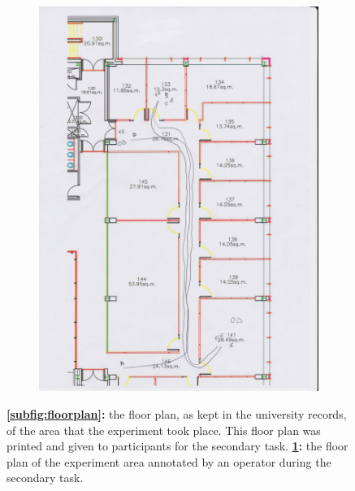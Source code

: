 \documentclass[a4paper,12pt,oneside,openright]{bhamthesis}
\begin{document}
\begin{figure}
\begin{subfigure}[b]{0.49\textwidth}
			\includegraphics[width=\textwidth]{chapter5_fig/floorplan_annotated.jpeg}
			\caption{}
			\label{subfig:floorplan_annotated}
		\end{subfigure}
		\hfill
		\caption{ \textbf{\ref{subfig:floorplan}:} the floor plan, as kept in the university records, of the area that the experiment took place. This floor plan was printed and given to participants for the secondary task. \textbf{\ref{subfig:floorplan_annotated}:} the floor plan of the experiment area annotated by an operator during the secondary task.}
		\label{fig:floorplan_exp3}
	\end{figure}
    
\end{document}
